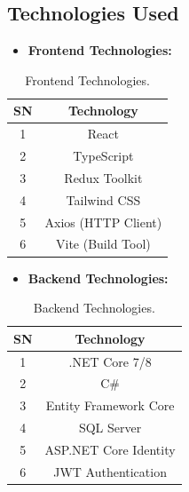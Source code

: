 \documentclass{thesis-library}
\begin{document}
\subsection{Technologies Used}

\begin{itemize}
    \item \textbf{Frontend Technologies:}
\end{itemize}
\vspace{5pt}
\begin{table}[H]
    \centering
    \caption{Frontend Technologies.}
    \vspace{10pt}
    \begin{tabular}{|c|c|}
        \hline
        \textbf{SN} & \textbf{Technology} \\
        \hline
        1  & React \\
        2  & TypeScript \\
        3  & Redux Toolkit \\
        4  & Tailwind CSS \\
        5  & Axios (HTTP Client) \\
        6  & Vite (Build Tool) \\
        \hline
    \end{tabular}
\end{table}
\vspace{10pt}

\begin{itemize}
    \item \textbf{Backend Technologies:}
\end{itemize}
\vspace{5pt}
\begin{table}[H]
    \centering
    \caption{Backend Technologies.}
    \vspace{10pt}
    \begin{tabular}{|c|c|}
        \hline
        \textbf{SN} & \textbf{Technology} \\
        \hline
        1  & .NET Core 7/8 \\
        2  & C\# \\
        3  & Entity Framework Core \\
        4  & SQL Server \\
        5  & ASP.NET Core Identity \\
        6  & JWT Authentication \\
        \hline
    \end{tabular}
\end{table}
\vspace{10pt}
\end{document}
